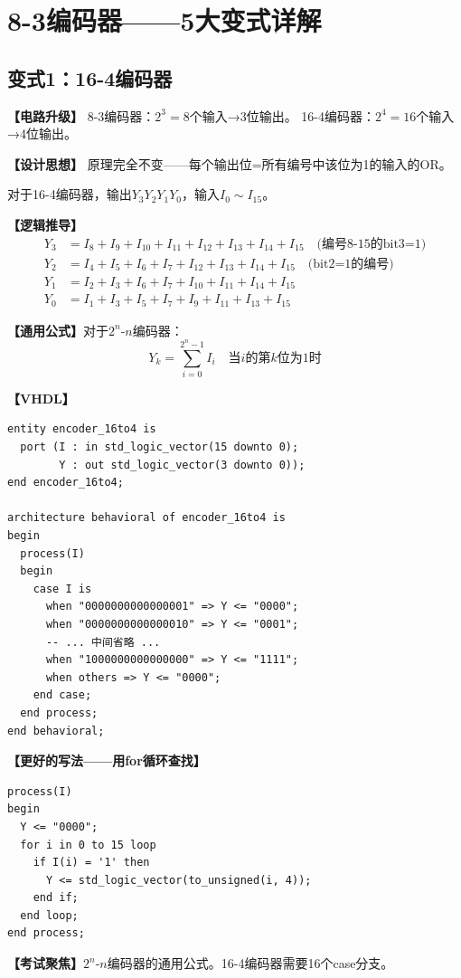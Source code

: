 \chapter{8-3编码器——5大变式详解}

\section{变式1：16-4编码器}

\begin{detailbox}[完整教学]
\textbf{【电路升级】}
8-3编码器：$2^3=8$个输入→3位输出。
16-4编码器：$2^4=16$个输入→4位输出。

\textbf{【设计思想】}
原理完全不变——每个输出位=所有编号中该位为1的输入的OR。

对于16-4编码器，输出$Y_3Y_2Y_1Y_0$，输入$I_0\sim I_{15}$。

\textbf{【逻辑推导】}
\begin{align}
Y_3 &= I_8+I_9+I_{10}+I_{11}+I_{12}+I_{13}+I_{14}+I_{15} \quad\text{(编号8-15的bit3=1)}\\
Y_2 &= I_4+I_5+I_6+I_7+I_{12}+I_{13}+I_{14}+I_{15} \quad\text{(bit2=1的编号)}\\
Y_1 &= I_2+I_3+I_6+I_7+I_{10}+I_{11}+I_{14}+I_{15}\\
Y_0 &= I_1+I_3+I_5+I_7+I_9+I_{11}+I_{13}+I_{15}
\end{align}

\textbf{【通用公式】}对于$2^n$-$n$编码器：
$$Y_k = \sum_{i=0}^{2^n-1} I_i \quad\text{当} i \text{的第}k\text{位为1时}$$

\textbf{【VHDL】}
\begin{lstlisting}
entity encoder_16to4 is
  port (I : in std_logic_vector(15 downto 0);
        Y : out std_logic_vector(3 downto 0));
end encoder_16to4;

architecture behavioral of encoder_16to4 is
begin
  process(I)
  begin
    case I is
      when "0000000000000001" => Y <= "0000";
      when "0000000000000010" => Y <= "0001";
      -- ... 中间省略 ...
      when "1000000000000000" => Y <= "1111";
      when others => Y <= "0000";
    end case;
  end process;
end behavioral;
\end{lstlisting}

\textbf{【更好的写法——用for循环查找】}
\begin{lstlisting}
process(I)
begin
  Y <= "0000";
  for i in 0 to 15 loop
    if I(i) = '1' then
      Y <= std_logic_vector(to_unsigned(i, 4));
    end if;
  end loop;
end process;
\end{lstlisting}

\textbf{【考试聚焦】}$2^n$-$n$编码器的通用公式。16-4编码器需要16个case分支。
\end{detailbox}


